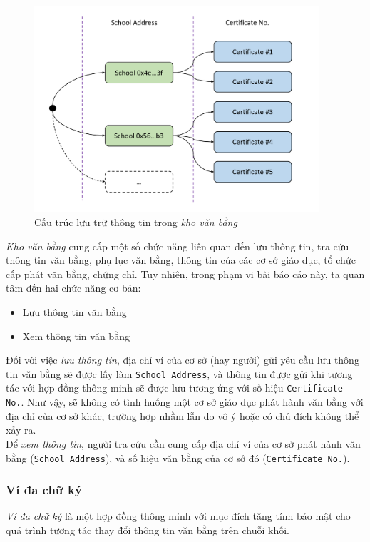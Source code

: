 \begin{figure}[!ht]
    \centering
    \includegraphics[width=400px]{images/certs-tree.png}
    \caption{Cấu trúc lưu trữ thông tin trong \textit{kho văn bằng}}
\end{figure}

\textit{Kho văn bằng} cung cấp một số chức năng liên quan đến lưu thông tin, tra cứu thông tin văn bằng, phụ lục văn bằng, thông tin của các cơ sở giáo dục, tổ chức cấp phát văn bằng, chứng chỉ. Tuy nhiên, trong phạm vi bài báo cáo này, ta quan tâm đến hai chức năng cơ bản:
\begin{itemize}
    \item Lưu thông tin văn bằng
    \item Xem thông tin văn bằng
\end{itemize}

Đối với việc \textit{lưu thông tin}, địa chỉ ví của cơ sở (hay người) gửi yêu cầu lưu thông tin văn bằng sẽ được lấy làm \texttt{School Address}, và thông tin được gửi khi tương tác với hợp đồng thông minh sẽ được lưu tương ứng với số hiệu \texttt{Certificate No.}. Như vậy, sẽ không có tình huống một cơ sở giáo dục phát hành văn bằng với địa chỉ của cơ sở khác, trường hợp nhầm lẫn do vô ý hoặc có chủ đích không thể xảy ra.\\

Để \textit{xem thông tin}, người tra cứu cần cung cấp địa chỉ ví của cơ sở phát hành văn bằng (\texttt{School Address}), và số hiệu văn bằng của cơ sở đó (\texttt{Certificate No.}).


\subsubsection{Ví đa chữ ký}
\textit{Ví đa chữ ký} là một hợp đồng thông minh với mục đích tăng tính bảo mật cho quá trình tương tác thay đổi thông tin văn bằng trên chuỗi khối.\\


